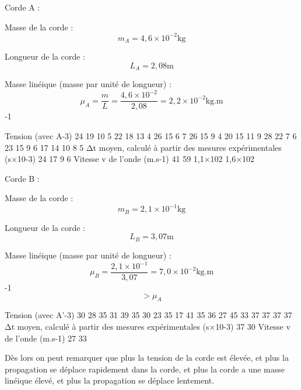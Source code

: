 Corde A :

Masse de la corde : \[m_A = 4,6\times10^{-2} \text{kg}\]

Longueur de la corde : \[L_A = 2,08 \text{m}\]

Masse linéique (masse par unité de longueur) :
\[\mu_A = \frac{m}{L} = \frac{4,6\times10^{-2}}{2,08} = 2,2\times10^{-2} \text{kg.m}\]-1

Tension (avec A-3)\textbar{} 24 \textbar{} 19 \textbar{} 10 \textbar{} 5
\textbar{} \textbar{} 22 \textbar{} 18 \textbar{} 13 \textbar{} 4
\textbar{} \textbar{} 26 \textbar{} 15 \textbar{} 6 \textbar{} 7
\textbar{} \textbar{} 26 \textbar{} 15 \textbar{} 9 \textbar{} 4
\textbar{} \textbar{} 20 \textbar{} 15 \textbar{} 11 \textbar{} 9
\textbar{} \textbar{} 28 \textbar{} 22 \textbar{} 7 \textbar{} 6
\textbar{} \textbar{} 23 \textbar{} 15 \textbar{} 9 \textbar{} 6
\textbar{} \textbar{} \textbar{} 17 \textbar{} 14 \textbar{} 10
\textbar{} \textbar{} \textbar{} \textbar{} 8 \textbar{} \textbar{}
\textbar{} \textbar{} \textbar{} 5 \textbar{} \textbar{} Δt moyen,
calculé à partir des mesures expérimentales (s×10-3)\textbar{} 24
\textbar{} 17 \textbar{} 9 \textbar{} 6 \textbar{} Vitesse v de l'onde
(m.s-1) \textbar{} 41 \textbar{} 59 \textbar{} 1,1×102 \textbar{}
1,6×102 \textbar{}

Corde B :

Masse de la corde : \[m_B = 2,1\times10^{-1} \text{kg}\]

Longueur de la corde : \[L_B = 3,07 \text{m}\]

Masse linéique (masse par unité de longueur) :
\[\mu_B = \frac{2,1\times10^{-1}}{3,07} = 7,0\times10^{-2} \text{kg.m}\]-1
\[> \mu_A\]

Tension (avec A'-3)\textbar{} 30 \textbar{} 28 \textbar{} \textbar{} 35
\textbar{} 31\textbar{} \textbar{} 39 \textbar{} 35\textbar{} \textbar{}
30 \textbar{} 23\textbar{} \textbar{} 35 \textbar{} 17\textbar{}
\textbar{} 41 \textbar{} 35\textbar{} \textbar{} 36 \textbar{}
27\textbar{} \textbar{} 45 \textbar{} 33\textbar{} \textbar{} 37
\textbar{} 37\textbar{} \textbar{} 37 \textbar{} 37\textbar{} Δt moyen,
calculé à partir des mesures expérimentales (s×10-3)\textbar{} 37
\textbar{} 30 \textbar{} Vitesse v de l'onde (m.s-1) \textbar{} 27
\textbar{} 33 \textbar{}

Dès lors on peut remarquer que plus la tension de la corde est élevée,
et plus la propagation se déplace rapidement dans la corde, et plus la
corde a une masse linéique élevé, et plus la propagation se déplace
lentement.

